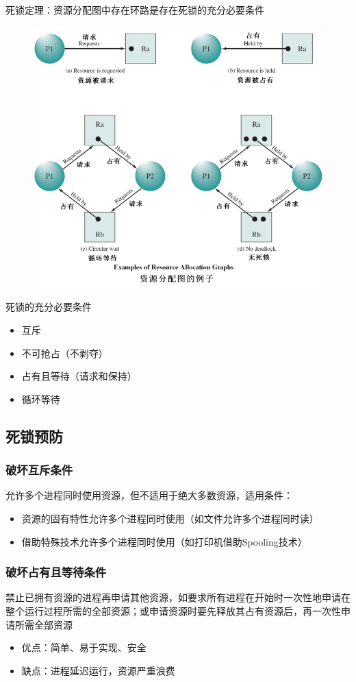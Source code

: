 死锁定理：资源分配图中存在环路是存在死锁的充分必要条件
\begin{figure}[H]
    \centering
    \includegraphics[width=0.6\linewidth]{fig/resource_graph.png}
\end{figure}

死锁的充分必要条件
\begin{itemize}
    \item 互斥
    \item 不可抢占（不剥夺）
    \item 占有且等待（请求和保持）
    \item 循环等待
\end{itemize}

\subsection{死锁预防}
\subsubsection{破坏互斥条件}
允许多个进程同时使用资源，但不适用于绝大多数资源，适用条件：
\begin{itemize}
\item 资源的固有特性允许多个进程同时使用（如文件允许多个进程同时读）
\item 借助特殊技术允许多个进程同时使用（如打印机借助Spooling技术）
\end{itemize}

\subsubsection{破坏占有且等待条件}
禁止已拥有资源的进程再申请其他资源，如要求所有进程在开始时一次性地申请在整个运行过程所需的全部资源；或申请资源时要先释放其占有资源后，再一次性申请所需全部资源
\begin{itemize}
    \item 优点：简单、易于实现、安全
    \item 缺点：进程延迟运行，资源严重浪费
\end{itemize}

